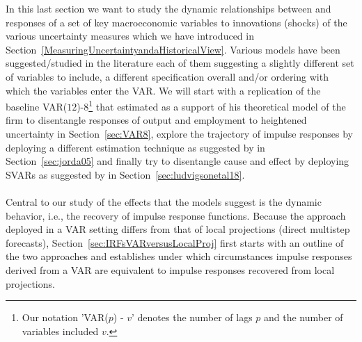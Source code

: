 \documentclass[a4paper,11pt,listof=nochaptergap,oneside,pointednumbers,bibtotoc,bigheadings,liststotoc]{scrbook}
\theoremstyle{mysatz}
\theoremstyle{mydefinition}
\theoremstyle{mybemerkung}
\begin{document}
\endgroup

In this last section we want to study the dynamic relationships between and responses of a set of key macroeconomic variables to innovations (shocks) of the various uncertainty measures which we have introduced in Section~\ref{MeasuringUncertaintyandaHistoricalView}. Various models have been suggested/studied in the literature each of them suggesting a slightly different set of variables to include, a different specification overall and/or ordering with which the variables enter the VAR. We will start with a replication of the baseline VAR($12$)-8\footnote{Our notation 'VAR($p$) - $v$' denotes the number of lags $p$ and the number of variables included $v$.} that \citet{bloom:09} estimated as a support of his theoretical model of the firm to disentangle responses of output and employment to heightened uncertainty in Section~\ref{sec:VAR8}, explore the trajectory of impulse responses by deploying a different estimation technique as suggested by \citet{jorda:05} in Section~\ref{sec:jorda05} and finally try to disentangle cause and effect by deploying SVARs as suggested by \citet{ludvigsonetal:18} in Section~\ref{sec:ludvigsonetal18}.\\
\\
Central to our study of the effects that the models suggest is the dynamic behavior, i.e., the recovery of impulse response functions. Because the approach deployed in a VAR setting differs from that of local projections (direct multistep forecasts), Section~\ref{sec:IRFsVARversusLocalProj} first starts with an outline of the two approaches and establishes under which circumstances impulse responses derived from a VAR are equivalent to impulse responses recovered from local projections.

\end{document}
